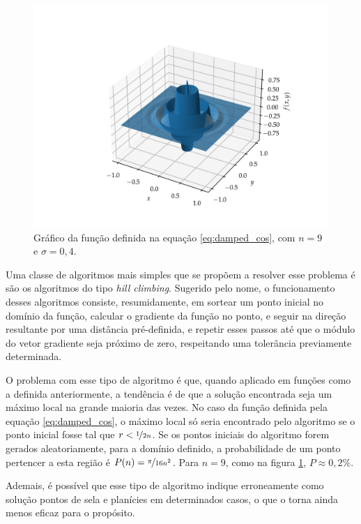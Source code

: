 \begin{figure}
  \centering
  \includegraphics[width=\textwidth]{imagens/figura1.png}
  \caption{Gráfico da função definida na equação \ref{eq:damped_cos}, com $ n = 9 $ e $ \sigma = 0,4 $.}
  \label{fig:damped_cos}
\end{figure}

Uma classe de algoritmos mais simples que se propõem a resolver esse problema é são os algoritmos do
tipo \textit{hill climbing}. Sugerido pelo nome, o funcionamento desses algoritmos consiste, resumidamente,
em sortear um ponto inicial no domínio da função, calcular o gradiente da função no ponto, e seguir
na direção resultante por uma distância pré-definida, e repetir esses passos até que o módulo do
vetor gradiente seja próximo de zero, respeitando uma tolerância previamente determinada. 

O problema com esse tipo de algoritmo é que, quando aplicado em funções como a definida anteriormente, a tendência é
de que a solução encontrada seja um máximo local na grande maioria das vezes. No caso da função definida
pela equação \ref{eq:damped_cos}, o máximo local só seria encontrado pelo algoritmo se o ponto inicial
fosse tal que $ r < \nicefrac{1}{2n} $. Se os pontos iniciais do algoritmo forem gerados aleatoriamente,
para a domínio definido, a probabilidade de um ponto pertencer a esta região é $ P(n) = \nicefrac{\pi}{16n^2} $.
Para $ n = 9 $, como na figura \ref{fig:damped_cos}, $ P \approx 0,2\% $. 

Ademais, é possível que esse tipo
de algoritmo indique erroneamente como solução pontos de sela e planícies em determinados casos, o que o
torna ainda menos eficaz para o propósito.

